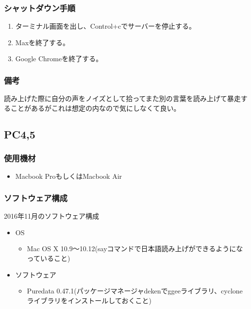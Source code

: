 \documentclass[a4paper]{jsarticle}
\begin{document}
\subsubsection{シャットダウン手順}\label{ux30b7ux30e3ux30c3ux30c8ux30c0ux30a6ux30f3ux624bux9806-1}

\begin{enumerate}
\def\labelenumi{\arabic{enumi}.}
\tightlist
\item
  ターミナル画面を出し、Control+cでサーバーを停止する。
\item
  Maxを終了する。
\item
  Google Chromeを終了する。
\end{enumerate}

\subsubsection{備考}\label{ux5099ux8003-1}

読み上げた際に自分の声をノイズとして拾ってまた別の言葉を読み上げて暴走することがあるがこれは想定の内なので気にしなくて良い。

\subsection{PC4,5}\label{pc45}

\subsubsection{使用機材}\label{ux4f7fux7528ux6a5fux6750-2}

\begin{itemize}
\tightlist
\item
  Macbook ProもしくはMacbook Air
\end{itemize}

\subsubsection{ソフトウェア構成}\label{ux30bdux30d5ux30c8ux30a6ux30a7ux30a2ux69cbux6210-2}

2016年11月のソフトウェア構成

\begin{itemize}
\tightlist
\item
  OS

  \begin{itemize}
  \tightlist
  \item
    Mac OS X
    10.9〜10.12(sayコマンドで日本語読み上げができるようになっていること)
  \end{itemize}
\item
  ソフトウェア

  \begin{itemize}
  \tightlist
  \item
    Puredata
    0.47.1(パッケージマネージャdekenでggeeライブラリ、cycloneライブラリをインストールしておくこと)
  \end{itemize}
\end{itemize}
\end{document}
